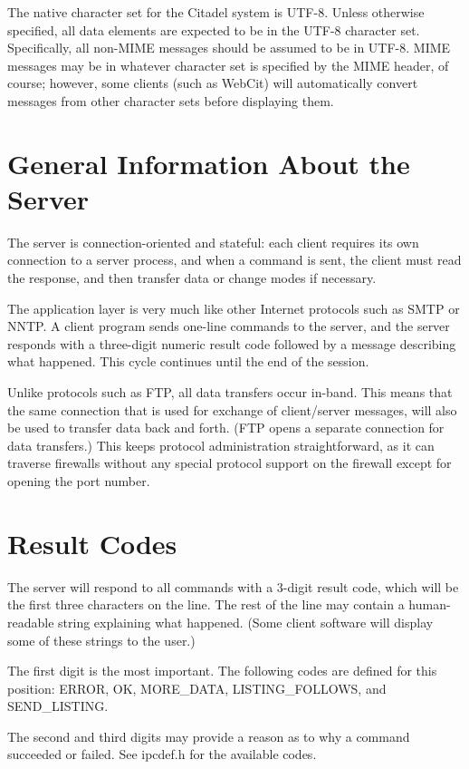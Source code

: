  The native character set for the Citadel system is UTF-8.  Unless otherwise
specified, all data elements are expected to be in the UTF-8 character set.
Specifically, all non-MIME messages should be assumed to be in UTF-8.  MIME
messages may be in whatever character set is specified by the MIME header, of
course; however, some clients (such as WebCit) will automatically convert
messages from other character sets before displaying them.


\section{General Information About the Server}

 The server is connection-oriented and stateful: each client requires its own
connection to a server process, and when a command is sent, the client must
read the response, and then transfer data or change modes if necessary.

 The application layer is very much like other Internet protocols such as SMTP
or NNTP.  A client program sends one-line commands to the server, and the
server responds with a three-digit numeric result code followed by a message
describing what happened.  This cycle continues until the end of the
session.

 Unlike protocols such as FTP, all data transfers occur in-band.  This means
that the same connection that is used for exchange of client/server
messages, will also be used to transfer data back and forth.  (FTP opens a
separate connection for data transfers.)  This keeps protocol administration
straightforward, as it can traverse firewalls without any special protocol
support on the firewall except for opening the port number.


\section{Result Codes}

 The server will respond to all commands with a 3-digit result code, which
will be the first three characters on the line.  The rest of the line may
contain a human-readable string explaining what happened.  (Some client
software will display some of these strings to the user.)

 The first digit is the most important.  The following codes are defined for
this position: ERROR, OK, MORE_DATA, LISTING_FOLLOWS, and SEND_LISTING.

 The second and third digits may provide a reason as to why a command
succeeded or failed.  See ipcdef.h for the available codes.

